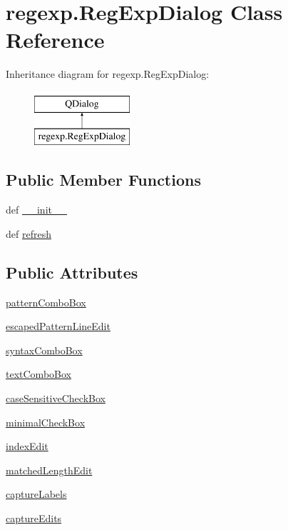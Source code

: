 \hypertarget{classregexp_1_1RegExpDialog}{}\section{regexp.\+Reg\+Exp\+Dialog Class Reference}
\label{classregexp_1_1RegExpDialog}
Inheritance diagram for regexp.\+Reg\+Exp\+Dialog\+:\begin{figure}[H]
\begin{center}
\leavevmode
\includegraphics[height=2.000000cm]{classregexp_1_1RegExpDialog}
\end{center}
\end{figure}
\subsection*{Public Member Functions}
\begin{DoxyCompactItemize}
\item 
def \hyperlink{classregexp_1_1RegExpDialog_aa560e5633582c23b397700b80c2c82e8}{\+\_\+\+\_\+init\+\_\+\+\_\+}
\item 
def \hyperlink{classregexp_1_1RegExpDialog_a1205ba08dab4fd3a499f7235ad20183b}{refresh}
\end{DoxyCompactItemize}
\subsection*{Public Attributes}
\begin{DoxyCompactItemize}
\item 
\hyperlink{classregexp_1_1RegExpDialog_a50d7f5a4ded544a783e2c38ad4d79d31}{pattern\+Combo\+Box}
\item 
\hyperlink{classregexp_1_1RegExpDialog_a6520becc8ff8614cee25c6b84757a5f7}{escaped\+Pattern\+Line\+Edit}
\item 
\hyperlink{classregexp_1_1RegExpDialog_a79e05ca94ff124c94d55e2bb5cc48657}{syntax\+Combo\+Box}
\item 
\hyperlink{classregexp_1_1RegExpDialog_a611d550fdfb30444ed1c1d5f3af4ada2}{text\+Combo\+Box}
\item 
\hyperlink{classregexp_1_1RegExpDialog_af438d4e94844e43f91687b56fdbbbe32}{case\+Sensitive\+Check\+Box}
\item 
\hyperlink{classregexp_1_1RegExpDialog_a719f381d2319bbb366f95e7d46db5571}{minimal\+Check\+Box}
\item 
\hyperlink{classregexp_1_1RegExpDialog_a39e1f70a5d29bb5df2389a7e319b7ddc}{index\+Edit}
\item 
\hyperlink{classregexp_1_1RegExpDialog_a5932e7f4a97febadc2874f9f2aa3e202}{matched\+Length\+Edit}
\item 
\hyperlink{classregexp_1_1RegExpDialog_a57bc76cceb7ea34cf54dee240aadb5b7}{capture\+Labels}
\item 
\hyperlink{classregexp_1_1RegExpDialog_ae5e7db4a6be424b04ab8a2f4a28744b3}{capture\+Edits}
\end{DoxyCompactItemize}

